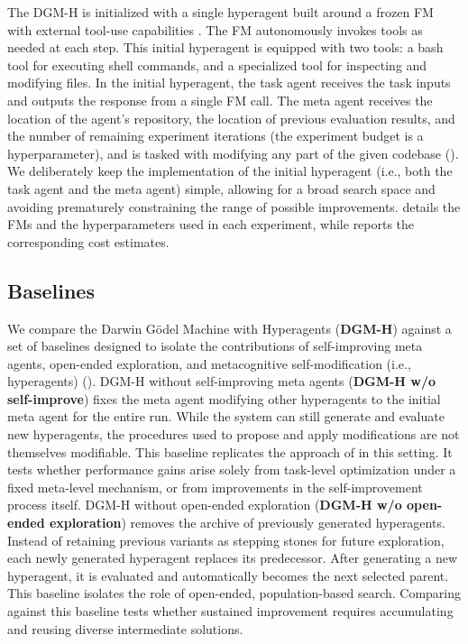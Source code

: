 \documentclass[]{fairmeta}
\begin{document}
The DGM-H is initialized with a single hyperagent built around a frozen FM \citep{brown2020language} with external tool-use capabilities \citep{schick2023toolformer}. The FM autonomously invokes tools as needed at each step. This initial hyperagent is equipped with two tools: a bash tool for executing shell commands, and a specialized tool for inspecting and modifying files. In the initial hyperagent, the task agent receives the task inputs and outputs the response from a single FM call. The meta agent receives the location of the agent's repository, the location of previous evaluation results, and the number of remaining experiment iterations (the experiment budget is a hyperparameter), and is tasked with modifying any part of the given codebase (). We deliberately keep the implementation of the initial hyperagent (i.e., both the task agent and the meta agent) simple, allowing for a broad search space and avoiding prematurely constraining the range of possible improvements.  details the FMs and the hyperparameters used in each experiment, while  reports the corresponding cost estimates.

\subsection{Baselines}
\label{sec:baselines}

We compare the Darwin G\"odel Machine with Hyperagents (\textbf{DGM-H}) against a set of baselines designed to isolate the contributions of self-improving meta agents, open-ended exploration, and metacognitive self-modification (i.e., hyperagents) ().
DGM-H without self-improving meta agents (\textbf{DGM-H w/o self-improve}) fixes the meta agent modifying other hyperagents to the initial meta agent for the entire run. While the system can still generate and evaluate new hyperagents, the procedures used to propose and apply modifications are not themselves modifiable. This baseline replicates the approach of \citep[ADAS,][]{huautomated} in this setting. It tests whether performance gains arise solely from task-level optimization under a fixed meta-level mechanism, or from improvements in the self-improvement process itself.
DGM-H without open-ended exploration (\textbf{DGM-H w/o open-ended exploration}) removes the archive of previously generated hyperagents. Instead of retaining previous variants as stepping stones for future exploration, each newly generated hyperagent replaces its predecessor. After generating a new hyperagent, it is evaluated and automatically becomes the next selected parent. This baseline isolates the role of open-ended, population-based search. Comparing against this baseline tests whether sustained improvement requires accumulating and reusing diverse intermediate solutions.
\end{document}
